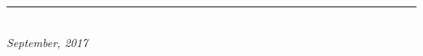 \begin{clearedpagestyle}
\begin{center}
\vspace*{0.5cm}
{\color{gray}\rule{0.3\textwidth}{\myrulewidth}}\\[1pt]
\textsl{September, 2017}\\[1pt]
\end{center}
\cleardoublepage
\end{clearedpagestyle}

